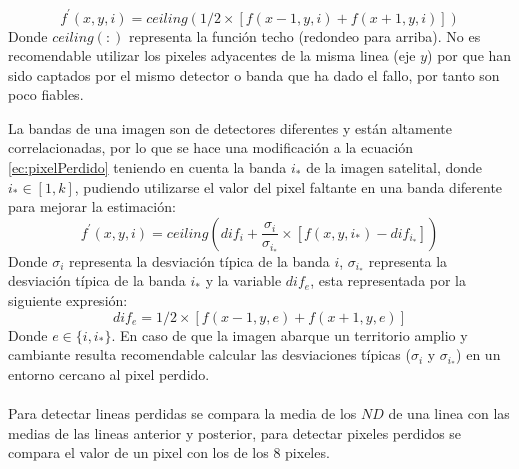 		\begin{equation}\label{ec:pixelPerdido}
		f^{'}(x,y,i) =  ceiling(1/2 \times [f(x-1,y,i) + f(x+1,y,i)])
		\end{equation} 
Donde $ ceiling(:) $ representa la funci\'on techo (redondeo para arriba). No es recomendable utilizar los pixeles adyacentes de la misma linea (eje $ y $) por que han sido captados por el mismo detector o banda que ha dado el fallo, por tanto son poco fiables.

La bandas de una imagen son de detectores diferentes y est\'an altamente correlacionadas, por lo que se hace una modificaci\'on a la ecuaci\'on \ref{ec:pixelPerdido} teniendo en cuenta la banda $ i_{*} $ de la imagen satelital, donde $ i_{*} \in [1,k] $, pudiendo utilizarse el valor del pixel faltante en una banda diferente para mejorar la estimaci\'on:
		\begin{equation}
		f^{'}(x,y,i) = ceiling( dif_{i}+ \dfrac{\sigma_{i}}{\sigma_{i_{*}}} \times [f(x,y,i_{*})-dif_{i_{*}}])
		\end{equation} 
Donde $ \sigma_{i} $ representa la desviaci\'on t\'ipica de la banda $ i $, $ \sigma_{i_{*}} $ representa la desviaci\'on t\'ipica de la banda $ i_{*} $ y la variable $ dif_{e} $, esta representada por la siguiente expresi\'on:
		\begin{equation}
		 dif_{e}  = 1/2 \times [f(x-1,y,e) + f(x+1,y,e)]
		\end{equation} 
Donde $ e \in \{ i,i_{*}\} $. En caso de que la imagen abarque un territorio amplio y cambiante resulta recomendable calcular las desviaciones t\'ipicas ($ \sigma_{i} $ y $ \sigma_{i_{*}} $) en un entorno cercano al pixel perdido.\\~\\
Para detectar lineas perdidas se compara la media de los $ ND $ de una linea con las medias de las lineas anterior y posterior, para detectar pixeles perdidos se compara el valor de un pixel con los de los 8 pixeles.
